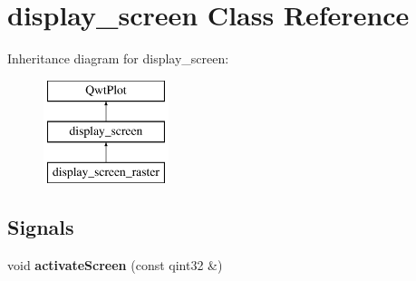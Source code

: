 \hypertarget{classdisplay__screen}{}\section{display\+\_\+screen Class Reference}
\label{classdisplay__screen}
Inheritance diagram for display\+\_\+screen\+:\begin{figure}[H]
\begin{center}
\leavevmode
\includegraphics[height=3.000000cm]{classdisplay__screen}
\end{center}
\end{figure}
\subsection*{Signals}
\begin{DoxyCompactItemize}
\item 
\mbox{\label{classdisplay__screen_ac606cfb3c58cd90b354c1b6997737074}} 
void {\bfseries activate\+Screen} (const qint32 \&)
\end{DoxyCompactItemize}
